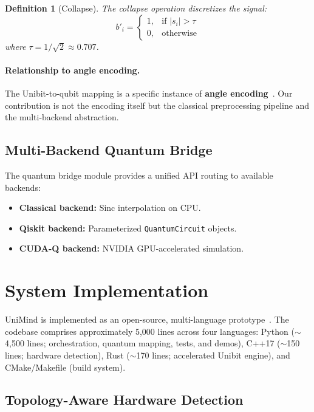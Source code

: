 ﻿\documentclass[12pt,a4paper]{article}
\newtheorem{definition}{Definition}[section]
\begin{document}
\begin{definition}[Collapse]
The collapse operation discretizes the signal:
\begin{equation}
    b'_i = \begin{cases} 1, & \text{if } |s_i| > \tau \\ 0, & \text{otherwise} \end{cases}
\end{equation}
where $\tau = 1/\sqrt{2} \approx 0.707$.
\end{definition}

\paragraph{Relationship to angle encoding.} The Unibit-to-qubit mapping is a specific instance of \textbf{angle encoding}~\cite{schuld2021,havlicek2019}. Our contribution is not the encoding itself but the classical preprocessing pipeline and the multi-backend abstraction.

\subsection{Multi-Backend Quantum Bridge}\label{sec:bridge}

The quantum bridge module provides a unified API routing to available backends:
\begin{itemize}
    \item \textbf{Classical backend:} Sinc interpolation on CPU.
    \item \textbf{Qiskit backend:} Parameterized \texttt{QuantumCircuit} objects.
    \item \textbf{CUDA-Q backend:} NVIDIA GPU-accelerated simulation.
\end{itemize}


\section{System Implementation}\label{sec:implementation}

UniMind is implemented as an open-source, multi-language prototype~\cite{tan2026}. The codebase comprises approximately 5,000 lines across four languages: Python ($\sim$4,500 lines; orchestration, quantum mapping, tests, and demos), C++17 ($\sim$150 lines; hardware detection), Rust ($\sim$170 lines; accelerated Unibit engine), and CMake/Makefile (build system).

\subsection{Topology-Aware Hardware Detection}
\end{document}
